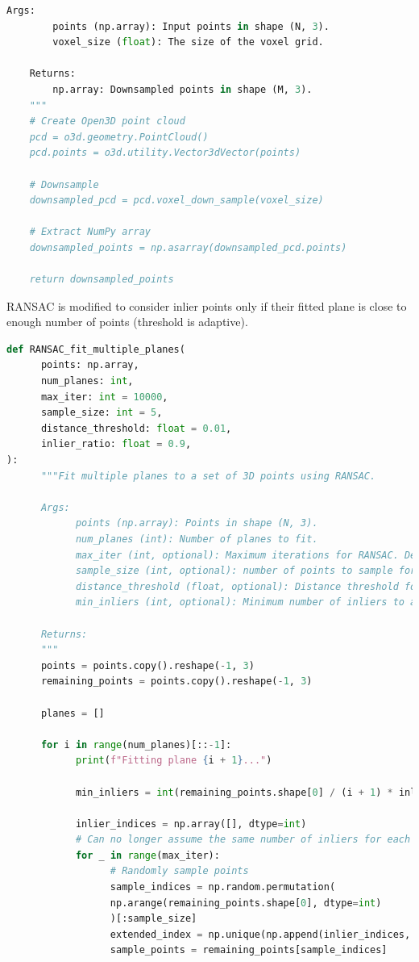 \documentclass[conference,onecolumn]{IEEEtran}
\begin{document}
\begin{enumerate}[label=\arabic{enumi}.]
\begin{enumerate}
\begin{lstlisting}[language=Python]
    Args:
        points (np.array): Input points in shape (N, 3).
        voxel_size (float): The size of the voxel grid.

    Returns:
        np.array: Downsampled points in shape (M, 3).
    """
    # Create Open3D point cloud
    pcd = o3d.geometry.PointCloud()
    pcd.points = o3d.utility.Vector3dVector(points)

    # Downsample
    downsampled_pcd = pcd.voxel_down_sample(voxel_size)

    # Extract NumPy array
    downsampled_points = np.asarray(downsampled_pcd.points)

    return downsampled_points
                        \end{lstlisting}
                        RANSAC is modified to consider inlier points only if their fitted plane is close to enough number of points (threshold is adaptive).
                        \begin{lstlisting}[language=Python]
def RANSAC_fit_multiple_planes(
      points: np.array,
      num_planes: int,
      max_iter: int = 10000,
      sample_size: int = 5,
      distance_threshold: float = 0.01,
      inlier_ratio: float = 0.9,
):
      """Fit multiple planes to a set of 3D points using RANSAC.

      Args:
            points (np.array): Points in shape (N, 3).
            num_planes (int): Number of planes to fit.
            max_iter (int, optional): Maximum iterations for RANSAC. Defaults to 10000.
            sample_size (int, optional): number of points to sample for every RANSAC iteration. Defaults to 5.
            distance_threshold (float, optional): Distance threshold for inliers. Defaults to 0.01.
            min_inliers (int, optional): Minimum number of inliers to accept a plane. Adjust as needed.

      Returns:
      """
      points = points.copy().reshape(-1, 3)
      remaining_points = points.copy().reshape(-1, 3)

      planes = []

      for i in range(num_planes)[::-1]:
            print(f"Fitting plane {i + 1}...")

            min_inliers = int(remaining_points.shape[0] / (i + 1) * inlier_ratio)

            inlier_indices = np.array([], dtype=int)
            # Can no longer assume the same number of inliers for each plane
            for _ in range(max_iter):
                  # Randomly sample points
                  sample_indices = np.random.permutation(
                  np.arange(remaining_points.shape[0], dtype=int)
                  )[:sample_size]
                  extended_index = np.unique(np.append(inlier_indices, sample_indices))
                  sample_points = remaining_points[sample_indices]


\end{lstlisting}
\end{enumerate}
\end{enumerate}
\end{document}
